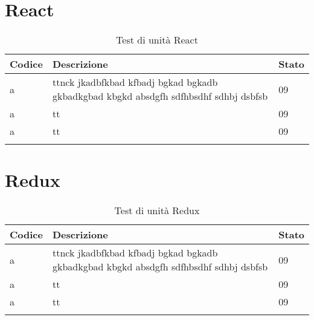 \documentclass[PianoDiQualifica.tex]{subfiles}
\begin{document}
\section{React}
\begin{longtable}[H]{P{2cm}P{8.5cm}P{3cm}}
	\color{CHeaderText}\textbf{Codice} & 
	\color{CHeaderText}\textbf{Descrizione} & 
	\color{CHeaderText}\textbf{Stato}\\
	\endhead
	a & ttnck  jkadbfkbad kfbadj bgkad bgkadb gkbadkgbad kbgkd absdgfh sdfhbsdhf sdhbj dsbfsb & 09 \\ 
	a & tt & 09 \\
	a & tt & 09 \\
	\hiderowcolors
	\caption{Test di unità React}
\end{longtable}

\section{Redux}
\begin{longtable}[H]{P{2cm}P{8.5cm}P{3cm}}
	\color{CHeaderText}\textbf{Codice} & 
	\color{CHeaderText}\textbf{Descrizione} & 
	\color{CHeaderText}\textbf{Stato}\\
	\endhead
	a & ttnck  jkadbfkbad kfbadj bgkad bgkadb gkbadkgbad kbgkd absdgfh sdfhbsdhf sdhbj dsbfsb & 09 \\ 
	a & tt & 09 \\
	a & tt & 09 \\
	\hiderowcolors
	\caption{Test di unità Redux}
\end{longtable}
\end{document}
